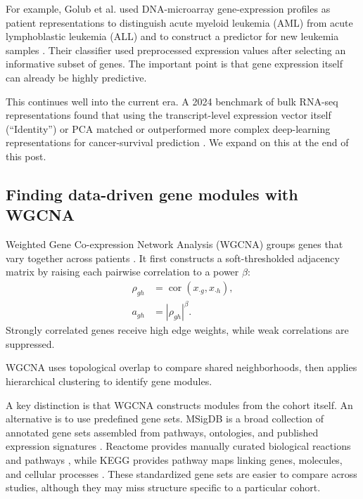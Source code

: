 \documentclass[11pt]{article}
\begin{document}
For example, Golub et al. used DNA-microarray gene-expression profiles as
patient representations to distinguish acute myeloid leukemia (AML) from acute
lymphoblastic leukemia (ALL) and to construct a predictor for new leukemia
samples \cite{golub1999molecular}. Their classifier used preprocessed
expression values after selecting an informative subset of genes. The important
point is that gene expression itself can already be highly predictive.

This continues well into the current era. A 2024 benchmark of bulk RNA-seq
representations found that using the transcript-level expression vector itself
(``Identity'') or PCA matched or outperformed more complex deep-learning
representations for cancer-survival prediction \cite{gross2024robust}. We expand on this at the end of this post.

\subsection{Finding data-driven gene modules with WGCNA}

Weighted Gene Co-expression Network Analysis (WGCNA) groups genes that vary
together across patients \cite{langfelder2008wgcna}. It first constructs a
soft-thresholded adjacency matrix by raising each pairwise correlation to a
power $\beta$:
\begin{equation}
    \begin{aligned}
        \rho_{gh} &= \operatorname{cor}(x_{\cdot g},x_{\cdot h}), \\
        a_{gh} &= |\rho_{gh}|^{\beta}.
    \end{aligned}
\end{equation}
Strongly correlated genes receive high edge weights, while weak correlations
are suppressed.

WGCNA uses topological overlap to compare shared neighborhoods, then applies
hierarchical clustering to identify gene modules.

A key distinction is that WGCNA constructs modules from the cohort itself.
An alternative is to use predefined gene sets. MSigDB is a broad collection of
annotated gene sets assembled from pathways, ontologies, and published
expression signatures \cite{liberzon2011msigdb}. Reactome provides manually
curated biological reactions and pathways \cite{milacic2024reactome}, while
KEGG provides pathway maps linking genes, molecules, and cellular processes
\cite{kanehisa2000kegg}. These standardized gene sets are easier to compare
across studies, although they may miss structure specific to a particular
cohort.
\end{document}
